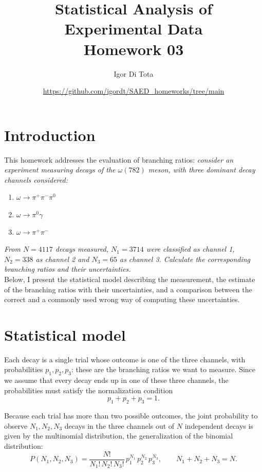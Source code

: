 \documentclass[11pt,a4paper]{article}
\title{Statistical Analysis of Experimental Data\\
	\vspace{0.2cm}
	\large{Homework 03}}
\author{Igor Di Tota}
\date{\small \url{https://github.com/igordt/SAED_homeworks/tree/main}}
\begin{document}
	\maketitle
	
	\section*{Introduction}
	
	This homework addresses the evaluation of branching ratios: \textit{consider an experiment measuring decays of the $\omega(782)$ meson, with three dominant decay channels considered:}
	\begin{enumerate}
		\item $\omega \to \pi^+\pi^-\pi^0$
		\item $\omega \to \pi^0\gamma$
		\item $\omega \to \pi^+\pi^-$
	\end{enumerate}
	\textit{From $N = 4117$ decays measured, $N_1 = 3714$ were classified as channel 1, $N_2 = 338$ as channel 2 and $N_3 = 65$ as channel 3. Calculate the corresponding branching ratios and their uncertainties.}\\
	
	Below, I present the statistical model describing the measurement, the estimate of the branching ratios with their uncertainties, and a comparison between the correct and a commonly used wrong way of computing these uncertainties.
	
	\section*{Statistical model}
	
	Each decay is a single trial whose outcome is one of the three channels, with probabilities $p_1, p_2, p_3$: these are the branching ratios we want to measure.
	Since we assume that every decay ends up in one of these three channels, the probabilities must satisfy the normalization condition
	\begin{equation}
		p_1 + p_2 + p_3 = 1 .
	\end{equation}
	
	Because each trial has more than two possible outcomes, the joint probability to observe $N_1, N_2, N_3$ decays in the three channels out of $N$ independent decays is given by the multinomial distribution, the generalization of the binomial distribution:
	\begin{equation}
		P(N_1, N_2, N_3) = \frac{N!}{N_1!\, N_2!\, N_3!}\, p_1^{N_1}\, p_2^{N_2}\, p_3^{N_3}, \qquad N_1 + N_2 + N_3 = N .
	\end{equation}
	
\end{document}
